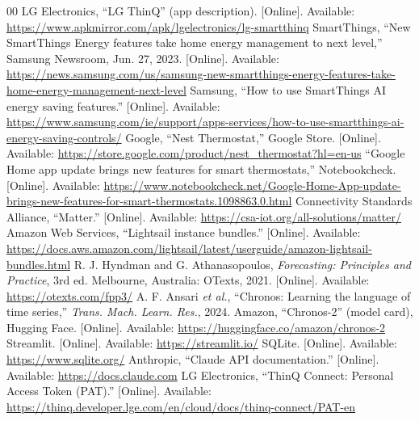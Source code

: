 \documentclass[conference,a4paper]{IEEEtran}
\begin{document}
\begin{thebibliography}{00}
 LG Electronics, ``LG ThinQ'' (app description). [Online]. Available: \url{https://www.apkmirror.com/apk/lgelectronics/lg-smartthinq}
 SmartThings, ``New SmartThings Energy features take home energy management to next level,'' Samsung Newsroom, Jun. 27, 2023. [Online]. Available: \url{https://news.samsung.com/us/samsung-new-smartthings-energy-features-take-home-energy-management-next-level}
 Samsung, ``How to use SmartThings AI energy saving features.'' [Online]. Available: \url{https://www.samsung.com/ie/support/apps-services/how-to-use-smartthings-ai-energy-saving-controls/}
 Google, ``Nest Thermostat,'' Google Store. [Online]. Available: \url{https://store.google.com/product/nest_thermostat?hl=en-us}
 ``Google Home app update brings new features for smart thermostats,'' Notebookcheck. [Online]. Available: \url{https://www.notebookcheck.net/Google-Home-App-update-brings-new-features-for-smart-thermostats.1098863.0.html}
 Connectivity Standards Alliance, ``Matter.'' [Online]. Available: \url{https://csa-iot.org/all-solutions/matter/}
 Amazon Web Services, ``Lightsail instance bundles.'' [Online]. Available: \url{https://docs.aws.amazon.com/lightsail/latest/userguide/amazon-lightsail-bundles.html}
 R. J. Hyndman and G. Athanasopoulos, \emph{Forecasting: Principles and Practice}, 3rd ed. Melbourne, Australia: OTexts, 2021. [Online]. Available: \url{https://otexts.com/fpp3/}
 A. F. Ansari \emph{et al.}, ``Chronos: Learning the language of time series,'' \emph{Trans. Mach. Learn. Res.}, 2024.
 Amazon, ``Chronos-2'' (model card), Hugging Face. [Online]. Available: \url{https://huggingface.co/amazon/chronos-2}
 Streamlit. [Online]. Available: \url{https://streamlit.io/}
 SQLite. [Online]. Available: \url{https://www.sqlite.org/}
 Anthropic, ``Claude API documentation.'' [Online]. Available: \url{https://docs.claude.com}
 LG Electronics, ``ThinQ Connect: Personal Access Token (PAT).'' [Online]. Available: \url{https://thinq.developer.lge.com/en/cloud/docs/thinq-connect/PAT-en}
\end{thebibliography}
\end{document}
